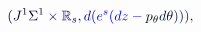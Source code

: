\documentclass[12pt]{article}
\begin{document}
\makeatletter
\renewcommand*{\@textcolor}[3]{%
  \protect\leavevmode
  \begingroup
    \color#1{#2}#3%
  \endgroup
}
\makeatother
\begin{displaymath}
\mathcolor[RGB]{0,0,15}{(} \mathcolor[RGB]{0,0,30}{J} ^ { \mathcolor[RGB]{0,0,45}{1} } \mathcolor[RGB]{0,0,60}{\Sigma} ^ { \mathcolor[RGB]{0,0,75}{1} } \mathcolor[RGB]{0,0,90}{\times} \mathbb { \mathcolor[RGB]{0,0,105}{R} } _ { \mathcolor[RGB]{0,0,120}{s} } \mathcolor[RGB]{0,0,135}{,} \mathcolor[RGB]{0,0,150}{d} \mathcolor[RGB]{0,0,165}{(} \mathcolor[RGB]{0,0,180}{e} ^ { \mathcolor[RGB]{0,0,195}{s} } \mathcolor[RGB]{0,0,210}{(} \mathcolor[RGB]{0,0,225}{d} \mathcolor[RGB]{0,0,240}{z} \mathcolor[RGB]{0,0,255}{-} \mathcolor[RGB]{0,15,0}{p} _ { \mathcolor[RGB]{0,15,15}{\theta} } \mathcolor[RGB]{0,15,30}{d} \mathcolor[RGB]{0,15,45}{\theta} \mathcolor[RGB]{0,15,60}{)} \mathcolor[RGB]{0,15,75}{)} \mathcolor[RGB]{0,15,90}{)} \mathcolor[RGB]{0,15,105}{,}
\end{displaymath}
\end{document}
